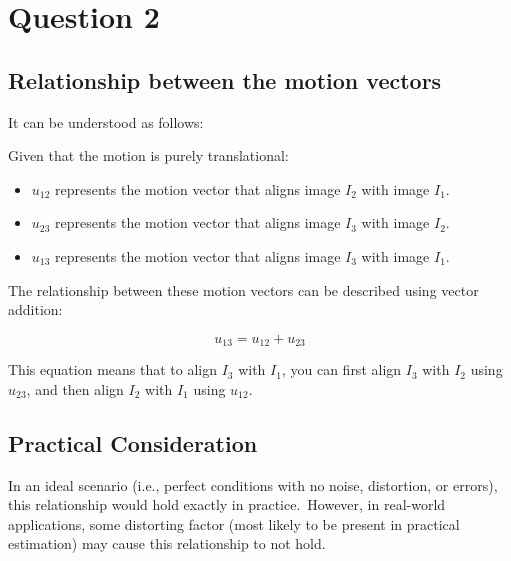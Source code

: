 \documentclass[12pt]{article}
\begin{document}
\section*{Question 2}

\vspace{-10pt}

\subsection*{Relationship between the motion vectors}

\vspace{-5pt}

It can be understood as follows:

Given that the motion is purely translational:

\vspace{-10pt}

\begin{itemize}[itemsep=-0.25em]
    \item $u_{12}$ represents the motion vector that aligns image $I_2$ with image $I_1$.
    \item $u_{23}$ represents the motion vector that aligns image $I_3$ with image $I_2$.
    \item $u_{13}$ represents the motion vector that aligns image $I_3$ with image $I_1$.
\end{itemize}

\vspace{-9pt}

The relationship between these motion vectors can be described using vector addition:

\vspace{-10pt}

\[
u_{13} = u_{12} + u_{23}
\]

This equation means that to align $I_3$ with $I_1$, you can first align $I_3$ with $I_2$ using $u_{23}$, and then align $I_2$ with $I_1$ using $u_{12}$.

\vspace{-10pt}

\subsection*{Practical Consideration}

\vspace{-5pt}

In an ideal scenario (i.e., perfect conditions with no noise, distortion, or errors), this relationship would hold exactly in practice.\ However, in real-world applications, some distorting factor (most likely to be present in practical estimation) may cause this relationship to not hold.
\end{document}

